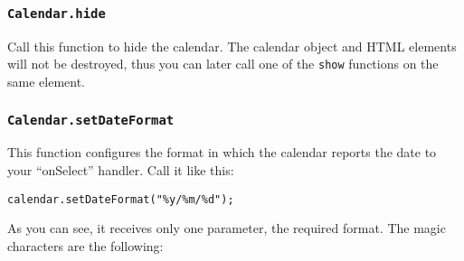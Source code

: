 \documentclass[a4paper,10pt]{article}
\begin{document}
\subsubsection{\texttt{Calendar.hide}}\label{sec:Calendar.hide}

Call this function to hide the calendar.  The calendar object and HTML elements
will not be destroyed, thus you can later call one of the \texttt{show}
functions on the same element.

\subsubsection{\texttt{Calendar.setDateFormat}}\label{sec:Calendar.setDateFormat}

This function configures the format in which the calendar reports the date to
your ``onSelect'' handler.  Call it like this:

\begin{verbatim}
calendar.setDateFormat("%y/%m/%d");
\end{verbatim}

As you can see, it receives only one parameter, the required format.  The magic
characters are the following:
\end{document}
